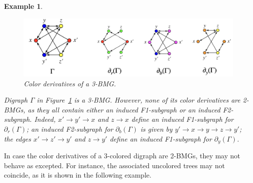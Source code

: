 \documentclass[final,3p,times]{elsarticle}
\newtheorem{example}{Example}[section]
\begin{document}
\begin{example}
\label{ex:color-derNo2BMG_3BMG}
\begin{figure}[ht]
  \centering
    \includegraphics[width=16cm]{figures/color_derivatives.png}
    \caption{Color derivatives of a 3-BMG.}
      \label{fig:color_derivatives}
\end{figure}

Digraph $\Gamma$ in Figure~\ref{fig:color_derivatives} is a 3-BMG. However, none of its color derivatives are 2-BMGs, as they all contain either an induced F1-subgraph or an induced F2-subgraph. Indeed, $x'\rightarrow y'\rightarrow x$ and $z\rightarrow x$ define an induced F1-subgraph for $\partial_r(\Gamma)$; an induced F2-subgraph for $\partial_b(\Gamma)$ is given by $y'\rightarrow x\rightarrow y\rightarrow z\rightarrow y'$; the edges $x'\rightarrow z'\rightarrow y'$ and $z \rightarrow y'$ define an induced F1-subgraph for $\partial_y(\Gamma)$.
\end{example}

In case the color derivatives of a 3-colored digraph are 2-BMGs, they may not behave as excepted. For instance, the associated uncolored trees may not coincide, as it is shown in the following example. 
\end{document}
